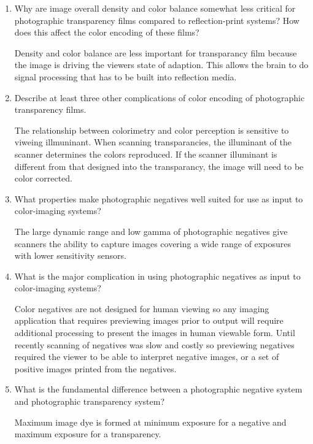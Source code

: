 \begin{enumerate}
 \item
   Why are image overall density and color balance somewhat less critical for photographic transparency films compared to reflection-print systems? How does this affect the color encoding of these films? \newline
 \par Density and color balance are less important for transparancy film because the image is driving the viewers state of adaption. This allows the brain to do signal processing that has to be built into reflection media. \newline
 \item
   Describe at least three other complications of color encoding of photographic transparency films. \newline
 \par The relationship between colorimetry and color perception is sensitive to viweing illmuninant.  When scanning transparancies, the illuminant of the scanner determines the colors reproduced.  If the scanner illuminant is different from that designed into the transparancy, the image will need to be color corrected.
 \item
  What properties make photographic negatives well suited for use as input to color-imaging systems? \newline
 \par The large dynamic range and low gamma of photographic negatives give scanners the ability to capture images covering a wide range of exposures with lower sensitivity sensors. \newline
 \item
 What is the major complication in using photographic negatives as input to color-imaging systems? \newline
 \par Color negatives are not designed for human viewing so any imaging application that requires previewing images prior to output will require additional processing to present the images in human viewable form.  Until recently scanning of negatives was slow and costly so previewing negatives required the viewer to be able to interpret negative images, or a set of positive images printed from the negatives. \newline
 \item
  What is the fundamental difference between a photographic negative system and photographic transparency system? \newline
 \par Maximum image dye is formed at minimum exposure for a negative and maximum exposure for a transparency. \newline

\end{enumerate}
